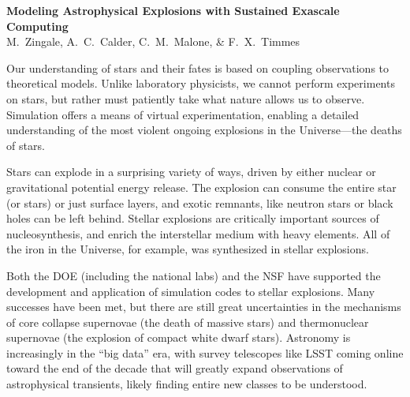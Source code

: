 \documentclass[11pt,twocolumn]{article}
\begin{document}
\thispagestyle{plain}

\begin{center}
{\sffamily \bfseries Modeling Astrophysical Explosions with Sustained 
                     Exascale Computing\footnotemark[1]} \\
{\small
M.~Zingale\footnotemark[2]\footnotemark[5], 
A.~C.~Calder\footnotemark[2], 
C.~M.~Malone\footnotemark[3],
\& F.~X.~Timmes\footnotemark[4]
}
\end{center}
%

Our understanding of stars and their fates is based on coupling
observations to theoretical models.  Unlike laboratory physicists, we
cannot perform experiments on stars, but rather must
patiently take what nature allows us to observe.  Simulation offers a means
of virtual experimentation, enabling a detailed understanding of the
most violent ongoing explosions in the Universe---the deaths of stars.

Stars can explode in a surprising variety of ways, driven by either
nuclear or gravitational potential energy release.  The
explosion can consume the entire star (or stars) or just
surface layers, and exotic remnants, like neutron stars or black holes
can be left behind.  Stellar explosions are critically important sources of
nucleosynthesis, and enrich the interstellar medium with heavy elements.
All of the iron in the Universe, for example, was synthesized in
stellar explosions.

Both the DOE (including the national labs) and the
NSF have supported the development and application of simulation codes
to stellar explosions.  Many successes have been met, but there are
still great uncertainties in the mechanisms of core collapse
supernovae (the death of massive stars) and thermonuclear supernovae
(the explosion of compact white dwarf stars).  Astronomy is increasingly
in the ``big data'' era, with survey telescopes
like LSST coming online toward the end of the decade that will greatly
expand observations of astrophysical transients, likely finding entire
new classes to be understood.
\end{document}
